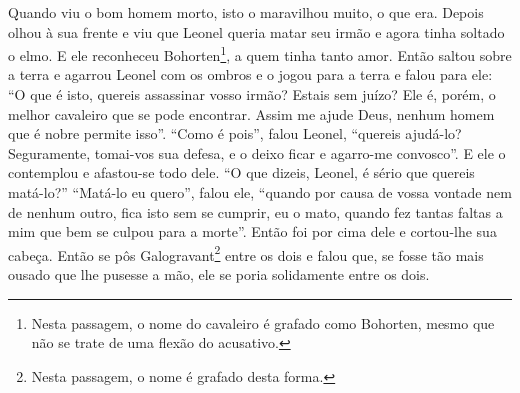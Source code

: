 Quando viu o bom homem morto, isto o maravilhou muito, o que era. Depois olhou
à sua frente e viu que Leonel queria matar seu irmão e agora tinha soltado o
elmo. E ele reconheceu Bohorten\footnote{ Nesta passagem, o nome do cavaleiro é
grafado como Bohorten, mesmo que não se trate de uma flexão do acusativo.},  
a quem tinha tanto amor. Então saltou sobre a terra e agarrou
Leonel com os ombros e o jogou para a terra e falou para ele: “O que é isto,
quereis assassinar vosso irmão? Estais sem juízo? Ele é, porém, o melhor
cavaleiro que se pode encontrar. Assim me ajude Deus, nenhum homem que é nobre
permite isso”. “Como é pois”, falou Leonel, “quereis ajudá-lo? Seguramente,
tomai-vos sua defesa, e o deixo ficar e agarro-me convosco”. E ele o contemplou
e afastou-se todo dele. “O que dizeis, Leonel, é sério que quereis matá-lo?”
“Matá-lo eu quero”, falou ele, “quando por causa de vossa vontade nem de nenhum
outro, fica isto sem se cumprir, eu o mato, quando fez tantas faltas a mim que
bem se culpou para a morte”. Então foi por cima dele e cortou-lhe sua cabeça.
Então se pôs Galogravant\footnote{ Nesta passagem, o nome é grafado desta forma.} 
entre os dois e falou que, se fosse tão mais ousado que lhe
pusesse a mão, ele se poria solidamente entre os dois.


